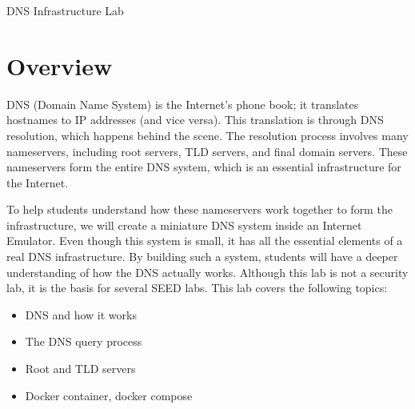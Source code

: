 
\newcommand{\commonfolder}{../../common-files}




\newcommand{\dnsFigs}{./Figs}


\usepackage{hyperref}




\begin{center}
{\LARGE DNS Infrastructure Lab}
\end{center}




\section{Overview}

DNS (Domain Name System) is the Internet's phone book; it
translates hostnames to IP addresses (and vice versa).
This translation is through DNS resolution, which happens behind
the scene. The resolution process involves many nameservers,
including root servers, TLD servers, and final domain servers.
These nameservers form the entire DNS system, which is an
essential infrastructure for the Internet.

To help students understand how these nameservers work together
to form the infrastructure, we will create a miniature DNS system
inside an Internet Emulator.
Even though this system is small, it has all the essential
elements of a real DNS infrastructure. By building such a system,
students will have a deeper understanding of how the DNS actually works.
Although this lab is not a security lab, it is the basis for
several SEED labs. This lab covers the following topics:

\begin{itemize}[noitemsep]
\item DNS and how it works
\item The DNS query process
\item Root and TLD servers
\item Docker container, docker compose
\end{itemize}


